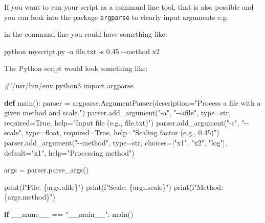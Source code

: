\documentclass[
  letterpaper,
  DIV=11,
  numbers=noendperiod]{scrartcl}
\newenvironment{Shaded}{\begin{snugshade}}{\end{snugshade}}
\newcommand{\BuiltInTok}[1]{\textcolor[rgb]{0.00,0.23,0.31}{#1}}
\newcommand{\CommentTok}[1]{\textcolor[rgb]{0.37,0.37,0.37}{#1}}
\newcommand{\ControlFlowTok}[1]{\textcolor[rgb]{0.00,0.23,0.31}{\textbf{#1}}}
\newcommand{\ImportTok}[1]{\textcolor[rgb]{0.00,0.46,0.62}{#1}}
\newcommand{\KeywordTok}[1]{\textcolor[rgb]{0.00,0.23,0.31}{\textbf{#1}}}
\newcommand{\NormalTok}[1]{\textcolor[rgb]{0.00,0.23,0.31}{#1}}
\newcommand{\OperatorTok}[1]{\textcolor[rgb]{0.37,0.37,0.37}{#1}}
\newcommand{\SpecialCharTok}[1]{\textcolor[rgb]{0.37,0.37,0.37}{#1}}
\newcommand{\SpecialStringTok}[1]{\textcolor[rgb]{0.13,0.47,0.30}{#1}}
\newcommand{\StringTok}[1]{\textcolor[rgb]{0.13,0.47,0.30}{#1}}
\newcommand{\VariableTok}[1]{\textcolor[rgb]{0.07,0.07,0.07}{#1}}
\begin{document}
If you want to run your script as a command line tool, that is also
possible and you can look into the package \texttt{argparse} to clearly
input arguments e.g.

in the command line you could have something like:

\begin{Shaded}
\begin{Highlighting}[]

\NormalTok{python myscript.py {-}a file.txt {-}s 0.45 {-}{-}method x2}
\end{Highlighting}
\end{Shaded}

The Python script would look something like:

\begin{Shaded}
\begin{Highlighting}[]
\CommentTok{\#!/usr/bin/env python3}
\ImportTok{import}\NormalTok{ argparse}

\KeywordTok{def}\NormalTok{ main():}
\NormalTok{    parser }\OperatorTok{=}\NormalTok{ argparse.ArgumentParser(description}\OperatorTok{=}\StringTok{"Process a file with a given method and scale."}\NormalTok{)}
\NormalTok{    parser.add\_argument(}\StringTok{"{-}a"}\NormalTok{, }\StringTok{"{-}{-}afile"}\NormalTok{, }\BuiltInTok{type}\OperatorTok{=}\BuiltInTok{str}\NormalTok{, required}\OperatorTok{=}\VariableTok{True}\NormalTok{, }\BuiltInTok{help}\OperatorTok{=}\StringTok{"Input file (e.g., file.txt)"}\NormalTok{)}
\NormalTok{    parser.add\_argument(}\StringTok{"{-}s"}\NormalTok{, }\StringTok{"{-}{-}scale"}\NormalTok{, }\BuiltInTok{type}\OperatorTok{=}\BuiltInTok{float}\NormalTok{, required}\OperatorTok{=}\VariableTok{True}\NormalTok{, }\BuiltInTok{help}\OperatorTok{=}\StringTok{"Scaling factor (e.g., 0.45)"}\NormalTok{)}
\NormalTok{    parser.add\_argument(}\StringTok{"{-}{-}method"}\NormalTok{, }\BuiltInTok{type}\OperatorTok{=}\BuiltInTok{str}\NormalTok{, choices}\OperatorTok{=}\NormalTok{[}\StringTok{"x1"}\NormalTok{, }\StringTok{"x2"}\NormalTok{, }\StringTok{"log"}\NormalTok{], default}\OperatorTok{=}\StringTok{"x1"}\NormalTok{, }\BuiltInTok{help}\OperatorTok{=}\StringTok{"Processing method"}\NormalTok{)}
    
\NormalTok{    args }\OperatorTok{=}\NormalTok{ parser.parse\_args()}

    \BuiltInTok{print}\NormalTok{(}\SpecialStringTok{f"File: }\SpecialCharTok{\{}\NormalTok{args}\SpecialCharTok{.}\NormalTok{afile}\SpecialCharTok{\}}\SpecialStringTok{"}\NormalTok{)}
    \BuiltInTok{print}\NormalTok{(}\SpecialStringTok{f"Scale: }\SpecialCharTok{\{}\NormalTok{args}\SpecialCharTok{.}\NormalTok{scale}\SpecialCharTok{\}}\SpecialStringTok{"}\NormalTok{)}
    \BuiltInTok{print}\NormalTok{(}\SpecialStringTok{f"Method: }\SpecialCharTok{\{}\NormalTok{args}\SpecialCharTok{.}\NormalTok{method}\SpecialCharTok{\}}\SpecialStringTok{"}\NormalTok{)}

\ControlFlowTok{if} \VariableTok{\_\_name\_\_} \OperatorTok{==} \StringTok{"\_\_main\_\_"}\NormalTok{:}
\NormalTok{    main()}
\end{Highlighting}
\end{Shaded}
\end{document}
